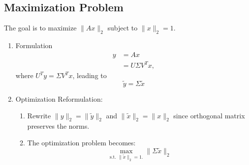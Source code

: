 \subsection{Maximization Problem}
\begin{derivation}
    The goal is to maximize \( \|A x\|_2 \) subject to \( \|x\|_2 = 1 \).
    \begin{enumerate}
        \item Formulation
        \begin{align*}
            y &= A x \\
              &= U \Sigma V^T x,
        \end{align*}
        where \( U^T y = \Sigma V^T x \), leading to 
        \begin{equation*}
            \tilde{y} = \Sigma \tilde{x}
        \end{equation*}
        \vspace{1em}

        \item Optimization Reformulation:
        \begin{enumerate}
            \item Rewrite \( \|y\|_2 = \|\tilde{y}\|_2 \) and \( \|\tilde{x}\|_2 = \|x\|_2 \) since orthogonal matrix preserves the norms.
            \item The optimization problem becomes:
              \[
              \max_{\text{s.t. } \|\tilde{x}\|_2 = 1.} \| \Sigma \tilde{x} \|_2 
              \]
        \end{enumerate}
     

\end{enumerate}
\end{derivation}
